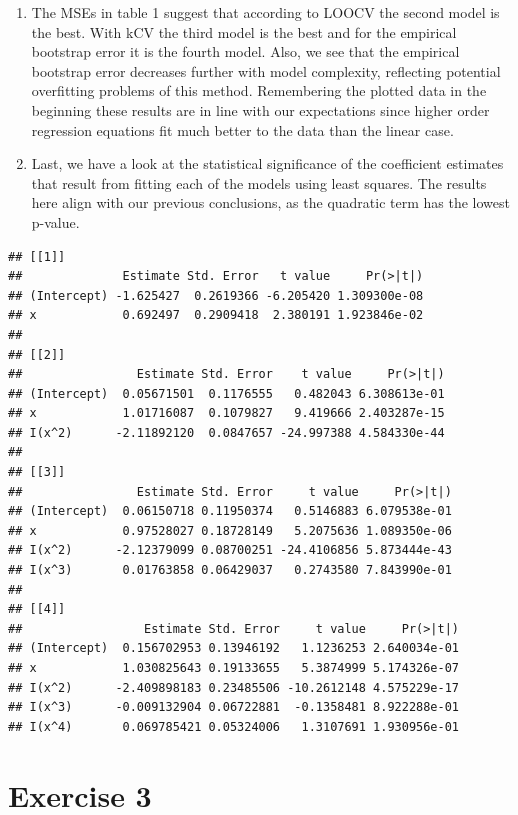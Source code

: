 \documentclass[
]{article}
\begin{document}
\begin{enumerate}
\def\labelenumi{(\alph{enumi})}
\setcounter{enumi}{3}
\item
  The MSEs in table 1 suggest that according to LOOCV the second model
  is the best. With kCV the third model is the best and for the
  empirical bootstrap error it is the fourth model. Also, we see that
  the empirical bootstrap error decreases further with model complexity,
  reflecting potential overfitting problems of this method. Remembering
  the plotted data in the beginning these results are in line with our
  expectations since higher order regression equations fit much better
  to the data than the linear case.
\item
  Last, we have a look at the statistical significance of the
  coefficient estimates that result from fitting each of the models
  using least squares. The results here align with our previous
  conclusions, as the quadratic term has the lowest p-value.
\end{enumerate}

\begin{verbatim}
## [[1]]
##              Estimate Std. Error   t value     Pr(>|t|)
## (Intercept) -1.625427  0.2619366 -6.205420 1.309300e-08
## x            0.692497  0.2909418  2.380191 1.923846e-02
## 
## [[2]]
##                Estimate Std. Error    t value     Pr(>|t|)
## (Intercept)  0.05671501  0.1176555   0.482043 6.308613e-01
## x            1.01716087  0.1079827   9.419666 2.403287e-15
## I(x^2)      -2.11892120  0.0847657 -24.997388 4.584330e-44
## 
## [[3]]
##                Estimate Std. Error     t value     Pr(>|t|)
## (Intercept)  0.06150718 0.11950374   0.5146883 6.079538e-01
## x            0.97528027 0.18728149   5.2075636 1.089350e-06
## I(x^2)      -2.12379099 0.08700251 -24.4106856 5.873444e-43
## I(x^3)       0.01763858 0.06429037   0.2743580 7.843990e-01
## 
## [[4]]
##                 Estimate Std. Error     t value     Pr(>|t|)
## (Intercept)  0.156702953 0.13946192   1.1236253 2.640034e-01
## x            1.030825643 0.19133655   5.3874999 5.174326e-07
## I(x^2)      -2.409898183 0.23485506 -10.2612148 4.575229e-17
## I(x^3)      -0.009132904 0.06722881  -0.1358481 8.922288e-01
## I(x^4)       0.069785421 0.05324006   1.3107691 1.930956e-01
\end{verbatim}

\hypertarget{exercise-3}{%
\section{Exercise 3}\label{exercise-3}}
\end{document}
